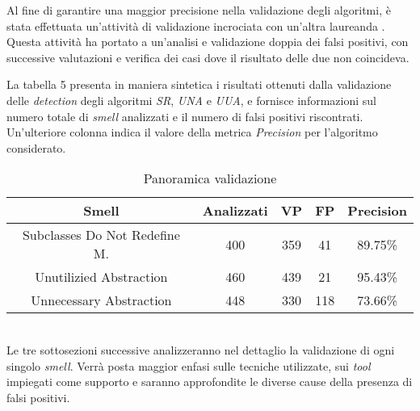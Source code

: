     Al fine di garantire una maggior precisione nella validazione degli algoritmi, è stata effettuata un'attività di validazione incrociata con un'altra laureanda \cite{rotaPhdTdthesis}. Questa attività ha portato a un'analisi e validazione doppia dei falsi positivi, con successive valutazioni e verifica dei casi dove il risultato delle due non coincideva. %
    
   La tabella 5 presenta in maniera sintetica i risultati ottenuti dalla validazione delle \textit{detection} degli algoritmi \textit{SR}, \textit{UNA} e \textit{UUA}, e fornisce informazioni sul numero totale di \textit{smell} analizzati e il numero di falsi positivi riscontrati. Un'ulteriore colonna indica il valore della metrica \textit{Precision} per l'algoritmo considerato. 
    \begin{table}[h]
            \centering
            \begin{tabular}{|c|c|c|c|c|}
                \hline
                \textbf{Smell} & \textbf{Analizzati} & \textbf{ VP } & \textbf{ FP } & \textbf{Precision} \\
                \hline
                Subclasses Do Not Redefine M. & 400 & 359 & 41 & 89.75\% \\ 
                Unutilizied Abstraction & 460 & 439 & 21 & 95.43\% \\
                Unnecessary Abstraction & 448 & 330 & 118 & 73.66\% \\
                \hline
        \end{tabular}
        \caption{Panoramica validazione}
        \label{tab:caption}
    \end{table}
     \\
    Le tre sottosezioni successive analizzeranno nel dettaglio la validazione di ogni singolo \textit{smell}. Verrà posta maggior enfasi sulle tecniche utilizzate, sui \textit{tool} impiegati come supporto e saranno approfondite le diverse cause della presenza di falsi positivi.
    
    
    
    
    
        
    
    
    